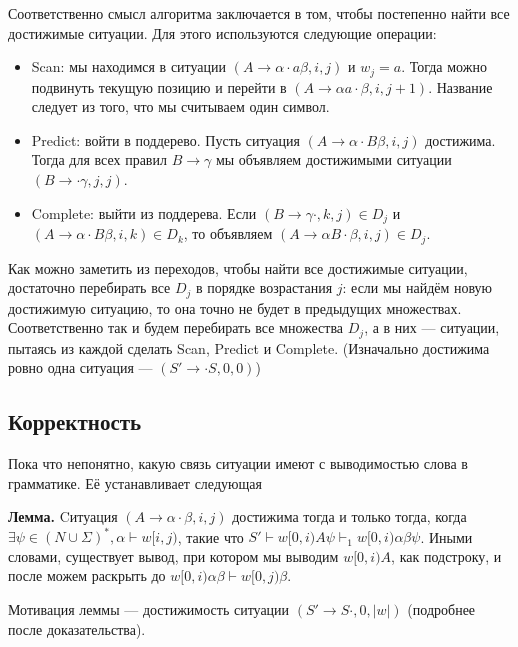Соответственно смысл алгоритма заключается в том, чтобы постепенно найти все достижимые ситуации. Для этого используются следующие операции:
\begin{itemize}
    \item Scan: мы находимся в ситуации $(A \to \alpha \cdot a \beta, i, j)$ и $w_j = a$.
        Тогда можно подвинуть текущую позицию и перейти в $(A \to \alpha a \cdot \beta, i, j + 1)$.
        Название следует из того, что мы считываем один символ.
    \item Predict: войти в поддерево. Пусть ситуация $(A \to \alpha \cdot B \beta, i, j)$ достижима. 
        Тогда для всех правил $B \to \gamma$ мы объявляем достижимыми ситуации $(B \to \cdot \gamma, j, j)$.
    \item Complete: выйти из поддерева. Если $(B \to \gamma \cdot, k, j) \in D_j$ и $(A \to \alpha \cdot B \beta, i, k) \in D_k$, то объявляем $(A \to \alpha B \cdot \beta, i, j) \in D_j$.
\end{itemize}

Как можно заметить из переходов, чтобы найти все достижимые ситуации, достаточно перебирать все $D_j$ в порядке возрастания $j$: если мы найдём новую достижимую ситуацию, то она точно не будет в предыдущих множествах.
Соответственно так и будем перебирать все множества $D_j$, а в них --- ситуации, пытаясь из каждой сделать Scan, Predict и Complete.
(Изначально достижима ровно одна ситуация --- $(S' \to \cdot S, 0, 0)$)

\subsection{Корректность}
Пока что непонятно, какую связь ситуации имеют с выводимостью слова в грамматике. Её устанавливает следующая

\textbf{Лемма.} Cитуация $(A \to \alpha \cdot \beta, i, j)$ достижима тогда и только тогда, когда $\exists \psi \in (N \cup \Sigma)^*, \alpha \vdash w[i,j)$, такие что $S' \vdash w[0,i) A \psi \vdash_1 w[0,i) \alpha \beta \psi$.
Иными словами, существует вывод, при котором мы выводим $w[0,i)A$, как подстроку, и после можем раскрыть до $w[0,i) \alpha \beta \vdash w[0,j) \beta$.

Мотивация леммы --- достижимость ситуации $(S' \to S \cdot, 0, |w|)$ (подробнее после доказательства).

